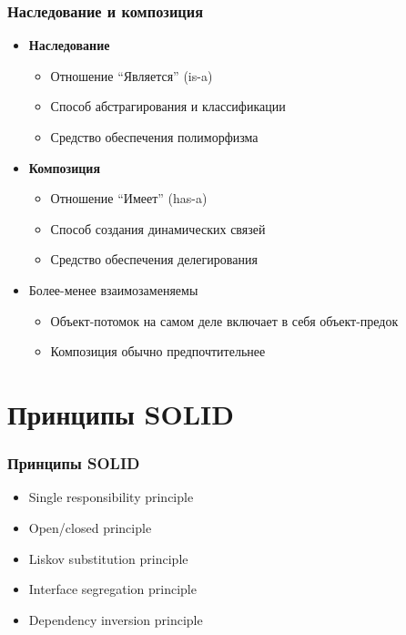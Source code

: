 \documentclass[xetex,mathserif,serif]{beamer}
\begin{document}
	\begin{frame}
		\frametitle{Наследование и композиция}
		\begin{itemize}
			\item \textbf{Наследование}
			\begin{itemize}
				\item Отношение ``Является'' (is-a)
				\item Способ абстрагирования и классификации
				\item Средство обеспечения полиморфизма
			\end{itemize}
			\item \textbf{Композиция}
			\begin{itemize}
				\item Отношение ``Имеет'' (has-a)
				\item Способ создания динамических связей
				\item Средство обеспечения делегирования
			\end{itemize}
			\item Более-менее взаимозаменяемы
			\begin{itemize}
				\item Объект-потомок на самом деле включает в себя объект-предок
				\item Композиция обычно предпочтительнее
			\end{itemize}
		\end{itemize}
	\end{frame}

	\section{Принципы SOLID}
	
	\begin{frame}
		\frametitle{Принципы SOLID}
		\begin{itemize}
			\item Single responsibility principle
			\item Open/closed principle
			\item Liskov substitution principle
			\item Interface segregation principle
			\item Dependency inversion principle
		\end{itemize}
	\end{frame}
\end{document}

